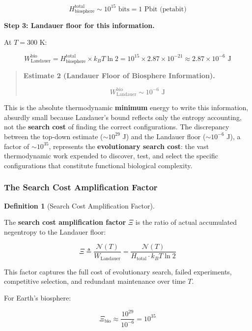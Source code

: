 \documentclass[11pt]{article}
\theoremstyle{plain}
\theoremstyle{definition}
\newtheorem{definition}{Definition}
\theoremstyle{remark}
\let\origsubsubsection\subsubsection
\renewcommand{\subsubsection}{\needspace{4\baselineskip}\origsubsubsection}
\begin{document}
\[H_{\text{biosphere}}^{\text{total}} \sim 10^{15} \text{ bits} = 1 \text{ Pbit (petabit)}\]

\textbf{Step 3: Landauer floor for this information.}

At \(T = 300\) K:

\[W_{\text{Landauer}}^{\text{bio}} = H_{\text{biosphere}}^{\text{total}} \times k_B T \ln 2 = 10^{15} \times 2.87 \times 10^{-21} \approx 2.87 \times 10^{-6} \text{ J}\]

\begin{quote}
\textbf{Estimate 2 (Landauer Floor of Biosphere Information).}

\[W_{\text{Landauer}}^{\text{bio}} \sim 10^{-6} \text{ J}\]
\end{quote}

This is the absolute thermodynamic \textbf{minimum} energy to write this
information, absurdly small because Landauer's bound reflects only the
entropy accounting, not the \textbf{search cost} of finding the correct
configurations. The discrepancy between the top-down estimate
(\(\sim 10^{29}\) J) and the Landauer floor (\(\sim 10^{-6}\) J), a
factor of \(\sim 10^{35}\), represents the \textbf{evolutionary search
cost}: the vast thermodynamic work expended to discover, test, and
select the specific configurations that constitute functional biological
complexity.

\subsubsection{The Search Cost Amplification
Factor}\label{the-search-cost-amplification-factor}

\begin{definition}[Search Cost Amplification Factor]
\label{def-search-cost-amplification}

The \textbf{search cost amplification factor} $\Xi$ is the ratio of actual accumulated negentropy to the Landauer floor:

$$\Xi \triangleq \frac{\mathcal{N}(T)}{W_{\text{Landauer}}} = \frac{\mathcal{N}(T)}{H_{\text{total}} \cdot k_B T \ln 2}$$

This factor captures the full cost of evolutionary search, failed experiments, competitive selection, and redundant maintenance over time $T$.
\end{definition}

For Earth's biosphere:

\[\Xi_{\text{bio}} \approx \frac{10^{29}}{10^{-6}} = 10^{35}\]
\end{document}
